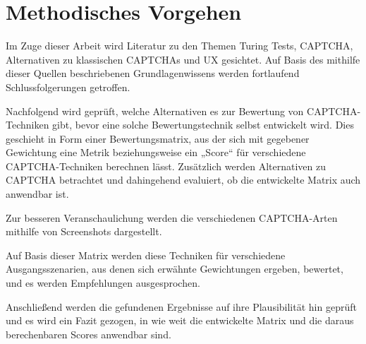 \chapter{Methodisches Vorgehen}
Im Zuge dieser Arbeit wird Literatur zu den Themen Turing Tests, CAPTCHA, Alternativen zu klassischen CAPTCHAs und UX gesichtet.
Auf Basis des mithilfe dieser Quellen beschriebenen Grundlagenwissens werden fortlaufend Schlussfolgerungen getroffen. 

Nachfolgend wird geprüft, welche Alternativen es zur Bewertung von CAPTCHA-Techniken gibt, bevor eine solche Bewertungstechnik selbst entwickelt wird. 
Dies geschieht in Form einer Bewertungsmatrix, aus der sich mit gegebener Gewichtung eine Metrik beziehungsweise ein „Score“ für verschiedene CAPTCHA-Techniken berechnen lässt. 
Zusätzlich werden Alternativen zu CAPTCHA betrachtet und dahingehend evaluiert, ob die entwickelte Matrix auch anwendbar ist.

Zur besseren Veranschaulichung werden die verschiedenen CAPTCHA-Arten mithilfe von Screenshots dargestellt.

Auf Basis dieser Matrix werden diese Techniken für verschiedene Ausgangsszenarien, 
aus denen sich erwähnte Gewichtungen ergeben, bewertet, und es werden Empfehlungen ausgesprochen.

Anschließend werden die gefundenen Ergebnisse auf ihre Plausibilität hin geprüft und es wird ein Fazit gezogen, 
in wie weit die entwickelte Matrix und die daraus berechenbaren Scores anwendbar sind.
  
